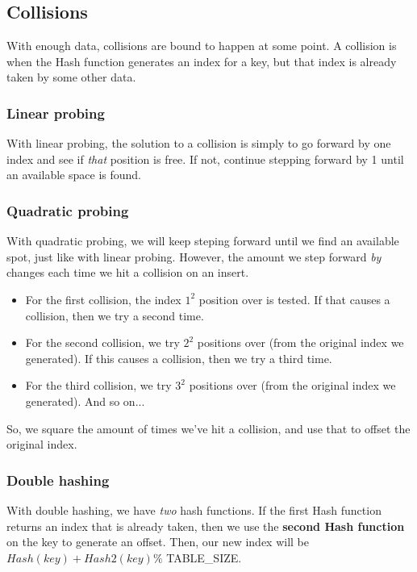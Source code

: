 \documentclass[a4paper,12pt,oneside]{book}
\begin{document}
\subsection{Collisions}

With enough data, collisions are bound to happen at some point. A collision
is when the Hash function generates an index for a key, but that index
is already taken by some other data.

\subsubsection{Linear probing}

With linear probing, the solution to a collision is simply to go forward
by one index and see if \textit{that} position is free. If not,
continue stepping forward by 1 until an available space is found.

\subsubsection{Quadratic probing}

With quadratic probing, we will keep steping forward until we find
an available spot, just like with linear probing. However, the amount
we step forward \textit{by} changes each time we hit a collision on an insert.

\begin{itemize}
    \item For the first collision, the index $1^{2}$ position over is tested. If
    that causes a collision, then we try a second time.

    \item For the second collision, we try $2^{2}$ positions over (from the original
    index we generated). If this causes a collision, then we try a third time.

    \item For the third collision, we try $3^{2}$ positions over (from the original
    index we generated). And so on...
\end{itemize}

So, we square the amount of times we've hit a collision, and use that
to offset the original index.

\subsubsection{Double hashing}

With double hashing, we have \textit{two} hash functions. If the first
Hash function returns an index that is already taken, then we
use the \textbf{second Hash function} on the key to generate an offset.
Then, our new index will be $Hash(key) + Hash2(key) \% $ TABLE\_SIZE.
\end{document}
